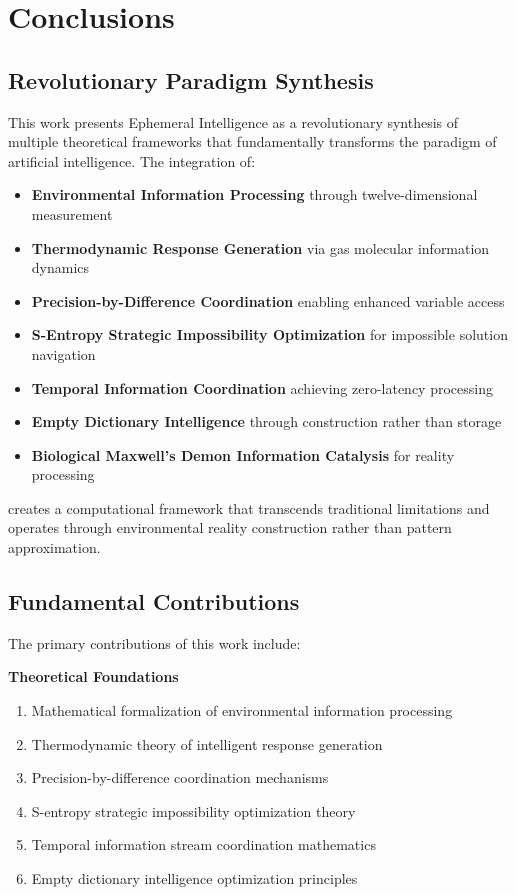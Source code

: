 \documentclass[12pt,a4paper]{article}
\begin{document}
\section{Conclusions}

\subsection{Revolutionary Paradigm Synthesis}

This work presents Ephemeral Intelligence as a revolutionary synthesis of multiple theoretical frameworks that fundamentally transforms the paradigm of artificial intelligence. The integration of:

\begin{itemize}
\item \textbf{Environmental Information Processing} through twelve-dimensional measurement
\item \textbf{Thermodynamic Response Generation} via gas molecular information dynamics
\item \textbf{Precision-by-Difference Coordination} enabling enhanced variable access
\item \textbf{S-Entropy Strategic Impossibility Optimization} for impossible solution navigation
\item \textbf{Temporal Information Coordination} achieving zero-latency processing
\item \textbf{Empty Dictionary Intelligence} through construction rather than storage
\item \textbf{Biological Maxwell's Demon Information Catalysis} for reality processing
\end{itemize}

creates a computational framework that transcends traditional limitations and operates through environmental reality construction rather than pattern approximation.

\subsection{Fundamental Contributions}

The primary contributions of this work include:

\textbf{Theoretical Foundations}
\begin{enumerate}
\item Mathematical formalization of environmental information processing
\item Thermodynamic theory of intelligent response generation
\item Precision-by-difference coordination mechanisms
\item S-entropy strategic impossibility optimization theory
\item Temporal information stream coordination mathematics
\item Empty dictionary intelligence optimization principles
\end{enumerate}
\end{document}
